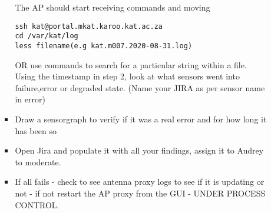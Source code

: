 \begin{itemize}
\begin{itemize}
\begin{itemize}
The AP should start receiving commands and moving
\begin{lstlisting}[style=DOS]
ssh kat@portal.mkat.karoo.kat.ac.za
cd /var/kat/log
less filename(e.g kat.m007.2020-08-31.log)
\end{lstlisting}
  OR use  commands to search for a particular string within a file.
 Using the timestamp in step 2, look at what sensors went into failure,error or degraded state. (Name your JIRA as per sensor name in error)
\item Draw a sensorgraph to verify if it was a real error and for how long it has been so
\item Open Jira and populate it with all your findings, assign it to Audrey to moderate.
\item If all fails - check to see antenna proxy logs to see if it is updating or not - if not restart the AP proxy from the GUI - UNDER PROCESS CONTROL. 
\end{itemize} 
\end{itemize}   
\end{itemize}  
         

